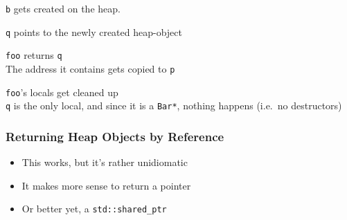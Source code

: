 \begin{frame}
\begin{overprint}
    \begin{center}
      {\tt b} gets created on the heap.
    \end{center}

    \begin{center}
      {\tt q} points to the newly created heap-object
    \end{center}

    \begin{center}
      {\tt foo} returns {\tt q} \\
      The address it contains gets copied to {\tt p}
    \end{center}

    \begin{center}
      {\tt foo}'s locals get cleaned up \\
      {\tt q} is the only local, and since it is a {\tt Bar*}, nothing happens (i.e.~no destructors)
    \end{center}
  \end{overprint}
\end{frame}

\begin{frame}
  \frametitle{Returning Heap Objects by Reference}
  \begin{itemize}
    \item This works, but it's rather unidiomatic
    \item It makes more sense to return a pointer
    \item Or better yet, a {\tt std::shared\_ptr}
  \end{itemize}
\end{frame}


